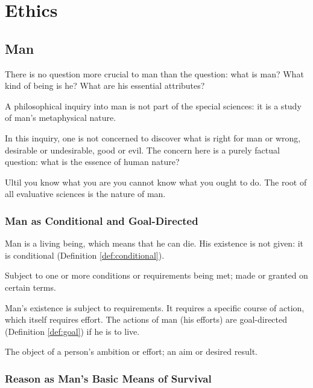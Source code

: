 \part{Ethics}
\label{part:ethics}

\chapter{Man}

    There is no question more crucial to man than the question: what is man? What kind of being is he? What are his essential attributes?

    A philosophical inquiry into man is not part of the special sciences: it is a study of man's metaphysical nature.

    In this inquiry, one is not concerned to discover what is right for man or wrong, desirable or undesirable, good or evil. The concern here is a purely factual question: what is the essence of human nature?

    Ultil you know what you are you cannot know what you ought to do. The root of all evaluative sciences is the nature of man.

    \section{Man as Conditional and Goal-Directed}

        Man is a living being, which means that he can die. His existence is not given: it is conditional (Definition \ref{def:conditional}).

            \begin{definition}[Conditional]
            \label{def:conditional}
                Subject to one or more conditions or requirements being met; made or granted on certain terms.
            \end{definition}

        Man's existence is subject to requirements. It requires a specific course of action, which itself requires effort. The actions of man (his efforts) are goal-directed (Definition \ref{def:goal}) if he is to live.

            \begin{definition}[Goal]
            \label{def:goal}
                The object of a person's ambition or effort; an aim or desired result.
            \end{definition}

    \section{Reason as Man's Basic Means of Survival}

